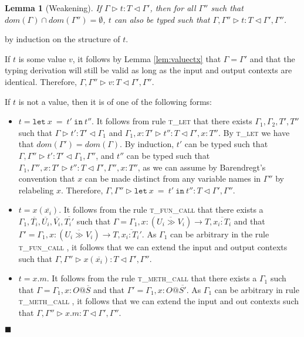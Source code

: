 \documentclass{article}
\newtheorem{lem}{Lemma}
\newcommand{\lemref}[1]{Lemma \ref{#1}}
\newcommand{\tlet}{\textsc{t\_let} }
\newcommand{\tfunc}{\textsc{t\_fun\_call} }
\newcommand{\tmethc}{\textsc{t\_meth\_call} }
\newcommand{\typerule}[4]{#1 \triangleright #2 : #3 \triangleleft #4}
\newcommand{\lett}[3]{\mathtt{let}\:#1\:\mathtt{=}\:#2\:\mathtt{in}\:#3}
\newcommand{\qed}{$\blacksquare$}
\newenvironment{proof}{\vspace{1ex}\noindent{\bf Proof}\hspace{0.5em}}
  {\hfill\qed\vspace{1ex}}
\begin{document}
\begin{lem}[Weakening]
If $\typerule{\Gamma}{t}{T}{\Gamma'}$,
then for all $\Gamma''$ such that $dom(\Gamma) \cap dom(\Gamma'') = \emptyset$,
$t$ can also be typed such that
$\typerule{\Gamma, \Gamma''}{t}{T}{\Gamma', \Gamma''}$.
\end{lem}
\begin{proof}
by induction on the structure of $t$.

If $t$ is some value $v$, it follows by \lemref{lem:valuectx} that 
$\Gamma = \Gamma'$ and that the typing derivation will still be valid as long
as the input and output contexts are identical. Therefore,
$\typerule{\Gamma , \Gamma''}{v}{T}{\Gamma', \Gamma''}$.

If $t$ is not a value, then it is of one of the following forms:

\begin{itemize}
\item $t = \lett{x}{t'}{t''}$. It follows from rule \tlet that
there exists $\Gamma_1, \Gamma_2, T', T''$ such that
$\typerule{\Gamma}{t'}{T'}{\Gamma_1}$ and
$\typerule{\Gamma_1, x : T'}{t''}{T}{\Gamma', x : T''}$.
By \tlet we have that $dom(\Gamma') = dom(\Gamma)$.
By induction, $t'$ can be typed such
that $\typerule{\Gamma,\Gamma''}{t'}{T'}{\Gamma_1,\Gamma''}$,
and $t''$ can be typed such that
$\typerule{\Gamma_1, \Gamma'', x : T'}{t''}{T}{\Gamma', \Gamma'', x : T''}$,
as we can assume by Barendregt's convention that $x$ can be made distinct from
any variable names in $\Gamma''$ by relabeling $x$.
Therefore,
$\typerule{\Gamma, \Gamma''}{\lett{x}{t'}{t''}}{T}{\Gamma', \Gamma''}$.

\item $t = x ( \overline{x_i} )$. It follows from the rule \tfunc that
there exists a $\Gamma_1, \overline{T_i}, \overline{U_i}, \overline{V_i}, \overline{T_i'}$ 
such that 
$\Gamma = \Gamma_1, x : (\overline{U_i \gg V_i}) \rightarrow T, \overline{x_i : T_i}$
and that
$\Gamma' = \Gamma_1, x : (\overline{U_i \gg V_i}) \rightarrow T, \overline{x_i : T_i'}$.
As $\Gamma_1$ can be arbitrary in the rule \tfunc, it follows that we
can extend the input and output contexts such that
$\typerule{\Gamma, \Gamma''}{x ( \overline{x_i} )}{T}{\Gamma', \Gamma''}$.

\item $t = x.m$. It follows from the rule \tmethc that there exists
a $\Gamma_1$ such that $\Gamma = \Gamma_1, x : O@\overline{S}$ and that 
$\Gamma' = \Gamma_1, x : O@\overline{S'}$.
As $\Gamma_1$ can be arbitrary in rule \tmethc, it follows that we can
extend the input and out contexts such that
$\typerule{\Gamma, \Gamma''}{x.m}{T}{\Gamma', \Gamma''}$.


\end{itemize}
\end{proof}
\end{document}
